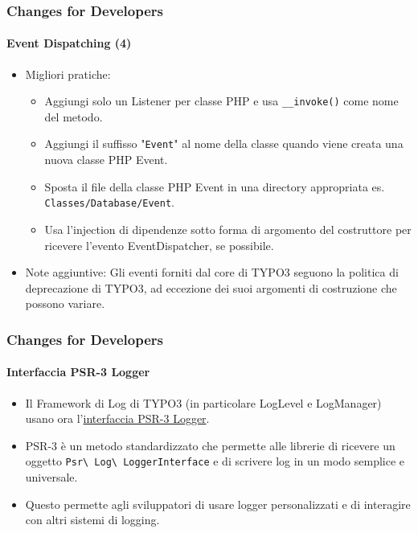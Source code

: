 
\begin{frame}[fragile]
	\frametitle{Changes for Developers}
	\framesubtitle{Event Dispatching (4)}

	\lstset{basicstyle=\tiny\ttfamily}

	\begin{itemize}
		\item Migliori pratiche:

			\begin{itemize}
				\item Aggiungi solo un Listener per classe PHP e usa \texttt{\_\_invoke()} come nome del metodo.
				\item Aggiungi il suffisso "\texttt{Event}" al nome della classe quando viene creata una nuova classe PHP Event.
				\item Sposta il file della classe PHP Event in una directory appropriata es. \texttt{Classes/Database/Event}.
				\item Usa l'injection di dipendenze sotto forma di argomento del costruttore per ricevere l'evento EventDispatcher,
				    se possibile.
			\end{itemize}

		\item Note aggiuntive:\newline
			\small
				Gli eventi forniti dal core di TYPO3 seguono la politica di deprecazione di TYPO3, ad eccezione dei suoi argomenti
				di costruzione che possono variare.
			\normalsize

	\end{itemize}

\end{frame}


\begin{frame}[fragile]
	\frametitle{Changes for Developers}
	\framesubtitle{Interfaccia PSR-3 Logger}

	\begin{itemize}
		\item Il Framework di Log di TYPO3 (in particolare LogLevel e LogManager) usano ora
			l'\href{https://www.php-fig.org/psr/psr-3/}{interfaccia PSR-3 Logger}.

		\item PSR-3 è un metodo standardizzato che permette alle librerie di ricevere un oggetto
			\texttt{Psr\textbackslash
				Log\textbackslash
				LoggerInterface} e di scrivere log in un modo semplice e universale.

			\item Questo permette agli sviluppatori di usare logger personalizzati e di interagire con altri sistemi
				di logging.

	\end{itemize}

\end{frame}


